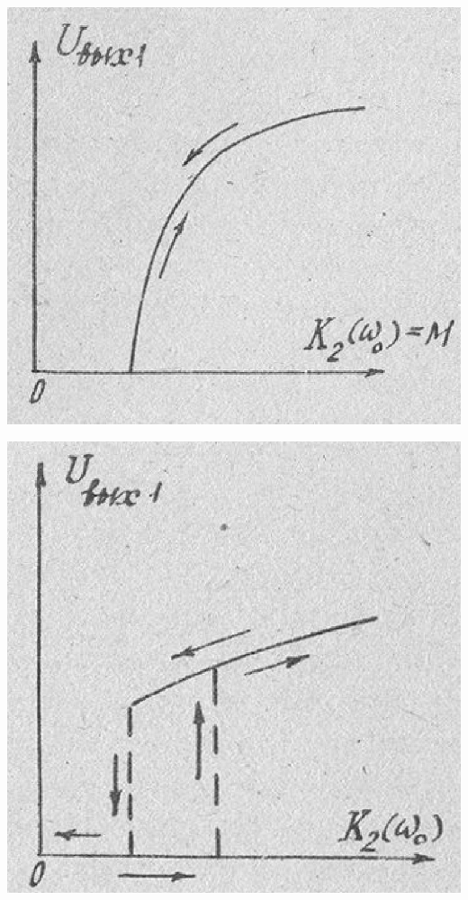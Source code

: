 \begin{center}
    \begin{minipage}{0.49\linewidth}
        \includegraphics[width=\linewidth]{circuit/10.jpg} 
        \label{fig:fig:10}
    \end{minipage}
\hfill     
    \begin{minipage}{0.49\linewidth}
        \centering
        \includegraphics[width=\linewidth]{circuit/11.jpg}  
        \label{fig:fig:11}
    \end{minipage} 
\end{center} 

